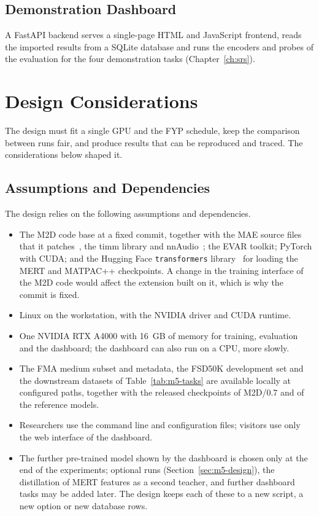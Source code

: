 \documentclass{FastFyp}
\begin{document}
\subsection{Demonstration Dashboard}
A FastAPI backend serves a single-page HTML and JavaScript frontend, reads the imported results from a SQLite database and runs the encoders and probes of the evaluation for the four demonstration tasks (Chapter~\ref{ch:srs}).

\section{Design Considerations}
\label{sec:des-considerations}
The design must fit a single GPU and the FYP schedule, keep the comparison between runs fair, and produce results that can be reproduced and traced. The considerations below shaped it.

\subsection{Assumptions and Dependencies}
The design relies on the following assumptions and dependencies.
\begin{itemize}
  \item The M2D code base at a fixed commit, together with the MAE source files that it patches~\cite{ref:He:2022mae}, the timm library and nnAudio~\cite{ref:Cheuk:2020nnaudio}; the EVAR toolkit; PyTorch with CUDA; and the Hugging Face \texttt{transformers} library~\cite{ref:Wolf:2020transformers} for loading the MERT and MATPAC++ checkpoints. A change in the training interface of the M2D code would affect the extension built on it, which is why the commit is fixed.
  \item Linux on the workstation, with the NVIDIA driver and CUDA runtime.
  \item One NVIDIA RTX A4000 with 16~GB of memory for training, evaluation and the dashboard; the dashboard can also run on a CPU, more slowly.
  \item The FMA medium subset and metadata, the FSD50K development set and the downstream datasets of Table~\ref{tab:m5-tasks} are available locally at configured paths, together with the released checkpoints of M2D/0.7 and of the reference models.
  \item Researchers use the command line and configuration files; visitors use only the web interface of the dashboard.
  \item The further pre-trained model shown by the dashboard is chosen only at the end of the experiments; optional runs (Section~\ref{sec:m5-design}), the distillation of MERT features as a second teacher, and further dashboard tasks may be added later. The design keeps each of these to a new script, a new option or new database rows.
\end{itemize}
\end{document}
